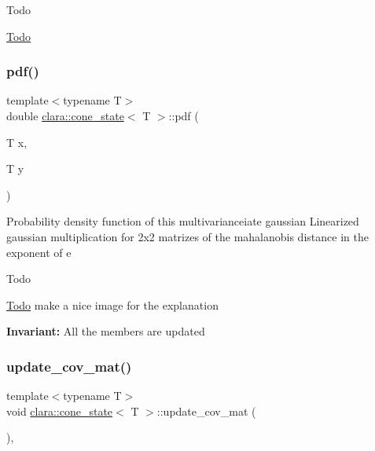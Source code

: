 \begin{DoxyRefDesc}{Todo}
\item[\hyperlink{todo__todo000005}{Todo}]\end{DoxyRefDesc}
\mbox{\label{classclara_1_1cone__state_a90b1ae9171e6196c19da0d883a8c2fdb}} 
\subsubsection{\texorpdfstring{pdf()}{pdf()}}
{\footnotesize\ttfamily template$<$typename T$>$ \\
double \hyperlink{classclara_1_1cone__state}{clara\+::cone\+\_\+state}$<$ T $>$\+::pdf (\begin{DoxyParamCaption}\item[{T}]{x,  }\item[{T}]{y }\end{DoxyParamCaption})\hspace{0.3cm}{\ttfamily [inline]}}



Probability density function of this multivarianceiate gaussian Linearized gaussian multiplication for 2x2 matrizes of the mahalanobis distance in the exponent of {\ttfamily e} 

\begin{DoxyRefDesc}{Todo}
\item[\hyperlink{todo__todo000006}{Todo}]make a nice image for the explanation\end{DoxyRefDesc}


{\bfseries Invariant\+:} All the members are updated \mbox{\label{classclara_1_1cone__state_a946bca664d068d7a82e3740eb736e948}} 
\subsubsection{\texorpdfstring{update\+\_\+cov\+\_\+mat()}{update\_cov\_mat()}}
{\footnotesize\ttfamily template$<$typename T$>$ \\
void \hyperlink{classclara_1_1cone__state}{clara\+::cone\+\_\+state}$<$ T $>$\+::update\+\_\+cov\+\_\+mat (\begin{DoxyParamCaption}{ }\end{DoxyParamCaption})\hspace{0.3cm}{\ttfamily [inline]}, {\ttfamily [private]}}



